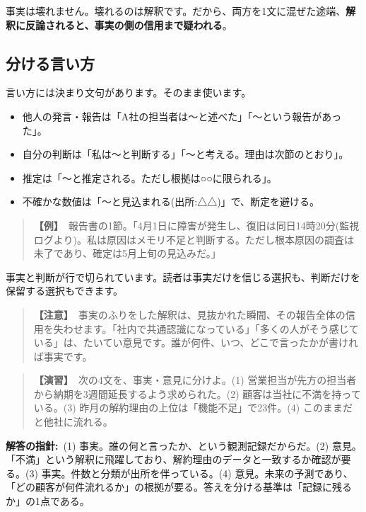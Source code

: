 \documentclass{article}
\begin{document}
事実は壊れません。壊れるのは解釈です。だから、両方を1文に混ぜた途端、\textbf{解釈に反論されると、事実の側の信用まで疑われる}。

\subsection{分ける言い方}

言い方には決まり文句があります。そのまま使います。

\begin{itemize}
\item 他人の発言・報告は「A社の担当者は〜と述べた」「〜という報告があった」。
\item 自分の判断は「私は〜と判断する」「〜と考える。理由は次節のとおり」。
\item 推定は「〜と推定される。ただし根拠は○○に限られる」。
\item 不確かな数値は「〜と見込まれる(出所:△△)」で、断定を避ける。
\end{itemize}

\begin{quote}
\textbf{【例】}\ 報告書の1節。「4月1日に障害が発生し、復旧は同日14時20分(監視ログより)。私は原因はメモリ不足と判断する。ただし根本原因の調査は未了であり、確定は5月上旬の見込みだ。」
\end{quote}

事実と判断が行で切られています。読者は事実だけを信じる選択も、判断だけを保留する選択もできます。

\begin{quote}
\textbf{【注意】}\ 事実のふりをした解釈は、見抜かれた瞬間、その報告全体の信用を失わせます。「社内で共通認識になっている」「多くの人がそう感じている」は、たいてい意見です。誰が何件、いつ、どこで言ったかが書ければ事実です。
\end{quote}

\begin{quote}
\textbf{【演習】}\ 次の4文を、事実・意見に分けよ。(1) 営業担当が先方の担当者から納期を3週間延長するよう求められた。(2) 顧客は当社に不満を持っている。(3) 昨月の解約理由の上位は「機能不足」で23件。(4) このままだと他社に流れる。
\end{quote}

\textbf{解答の指針:}\ (1) 事実。誰の何と言ったか、という観測記録だからだ。(2) 意見。「不満」という解釈に飛躍しており、解約理由のデータと一致するか確認が要る。(3) 事実。件数と分類が出所を伴っている。(4) 意見。未来の予測であり、「どの顧客が何件流れるか」の根拠が要る。答えを分ける基準は「記録に残るか」の1点である。
\end{document}
